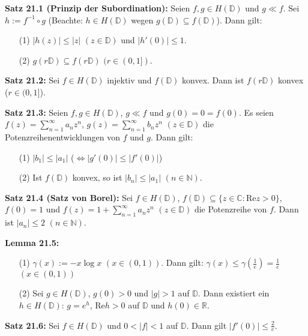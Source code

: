 \documentclass[11pt]{article}
\newcommand{\C}{\mathbb{C}}
\newcommand{\R}{\mathbb{R}}
\newcommand{\N}{\mathbb{N}}
\newcommand{\D}{\mathbb{D}}
\begin{document}
\textbf{Satz 21.1 (Prinzip der Subordination):} Seien $f,g \in H(\D)$ und $g \ll f$. Sei $h := f^{-1} \circ g$ (Beachte: $h \in H(\D)$ wegen $g(\D) \subseteq f(\D)$). Dann gilt: 
\vspace{-0.6cm}
\begin{itemize}
\item[(1)] $|h(z)| \leq |z|$ $(z \in \D)$ und $|h'(0)| \leq 1$. \vspace{-0.2cm}
\item[(2)] $g(r\D) \subseteq f(r \D)$ $(r \in (0,1])$.
\end{itemize}
\vspace{-0.3cm}

\textbf{Satz 21.2:} Sei $f \in H(\D)$ injektiv und $f(\D)$ konvex. Dann ist $f(r\D)$ konvex ($r \in (0,1]$).

\newpage
\textbf{Satz 21.3:} Seien $f,g \in H(\D)$, $g \ll f$ und $g(0)=0=f(0)$. Es seien $f(z)=\sum_{n=1}^\infty a_n z^n$, $g(z)=\sum_{n=1}^\infty b_n z^n$ $(z \in \D)$ die Potenzreihenentwicklungen von $f$ und $g$. Dann gilt:
\vspace{-0.6cm}
\begin{itemize}
\item[(1)] $|b_1| \leq |a_1|$ ($\Leftrightarrow |g'(0)| \leq |f'(0)|$) \vspace{-0.2cm}
\item[(2)] Ist $f(\D)$ konvex, so ist $|b_n| \leq |a_1|$ $(n \in \N)$.
\end{itemize}
\vspace{-0.3cm}

\textbf{Satz 21.4 (Satz von Borel):} Sei $f \in H(\D)$, $f(\D) \subseteq \{ z \in \C \colon \text{Re} z > 0 \}$, $f(0) = 1$ und $f(z) = 1 + \sum_{n=1}^\infty a_n z^n$ $(z \in \D)$ die Potenzreihe von $f$. Dann ist $|a_n| \leq 2$ $(n \in \N)$.

\textbf{Lemma 21.5:} 
\vspace{-0.6cm}
\begin{itemize}
\item[(1)] $\gamma(x) := -x \log x$ $(x \in (0,1))$. Dann gilt: $\gamma(x) \leq \gamma(\frac{1}{e}) = \frac{1}{e}$ $(x \in (0,1))$ \vspace{-0.2cm}
\item[(2)] Sei $g \in H(\D)$, $g(0) > 0$ und $|g|>1$ auf $\D$. Dann existiert ein $h \in H(\D)$: $g = e^h$, Re$h > 0$ auf $\D$ und $h(0) \in \R$.
\end{itemize}
\vspace{-0.3cm}

\textbf{Satz 21.6:} Sei $f \in H(\D)$ und $0 < |f| < 1$ auf $\D$. Dann gilt $|f'(0)| \leq \frac{2}{e}$.
\end{document}
